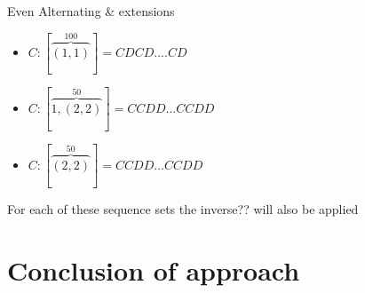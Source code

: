      
Even Alternating \& extensions
\begin{itemize}
    \item $C:[\overbrace{(1,1)}^{100}] = CDCD....CD$
    \item $C:[\overbrace{1,(2,2)}^{50}] = CCDD...CCDD$
    \item $C:[\overbrace{(2,2)}^{50}] = CCDD...CCDD$
\end{itemize} 
For each of these sequence sets the inverse?? will also be applied

\section{Conclusion of approach}